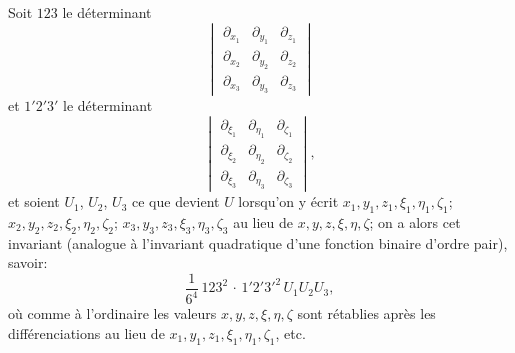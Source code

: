 \documentclass[11pt,a4paper]{article}
\theoremstyle{definition}
\begin{document}
Soit $123$ le d\'{e}terminant
\[
\begin{vmatrix}
\partial_{x_{1}} & \partial_{y_{1}} & \partial_{z_{1}} \\
\partial_{x_{2}} & \partial_{y_{2}} & \partial_{z_{2}} \\
\partial_{x_{3}} & \partial_{y_{3}} & \partial_{z_{3}}
\end{vmatrix}
\]
et $1'2'3'$ le d\'{e}terminant
\[
\begin{vmatrix}
\partial_{\xi_{1}} & \partial_{\eta_{1}} & \partial_{\zeta_{1}} \\
\partial_{\xi_{2}} & \partial_{\eta_{2}} & \partial_{\zeta_{2}} \\
\partial_{\xi_{3}} & \partial_{\eta_{3}} & \partial_{\zeta_{3}}
\end{vmatrix},
\]
et soient $U_{1}$, $U_{2}$, $U_{3}$ ce que devient $U$ lorsqu'on y \'{e}crit
$x_{1},y_{1},z_{1},\xi_{1},\eta_{1},\zeta_{1}$;
$x_{2},y_{2},z_{2},\xi_{2},\eta_{2},\zeta_{2}$;
$x_{3},y_{3},z_{3},\xi_{3},\eta_{3},\zeta_{3}$
au lieu de $x,y,z,\xi,\eta,\zeta$; on a alors cet invariant (analogue \`{a}
l'invariant quadratique d'une fonction binaire d'ordre pair), savoir:
\[\frac{1}{6^{4}}\,123^{2}\,\cdot\,1'2'3'^{2}\,U_{1}U_{2}U_{3},\]
o\`{u} comme \`{a} l'ordinaire les valeurs $x,y,z,\xi,\eta,\zeta$ sont r\'{e}tablies
apr\`{e}s les diff\'{e}renciations au lieu de $x_{1},y_{1},z_{1},\xi_{1},\eta_{1},\zeta_{1}$, etc.
\end{document}
